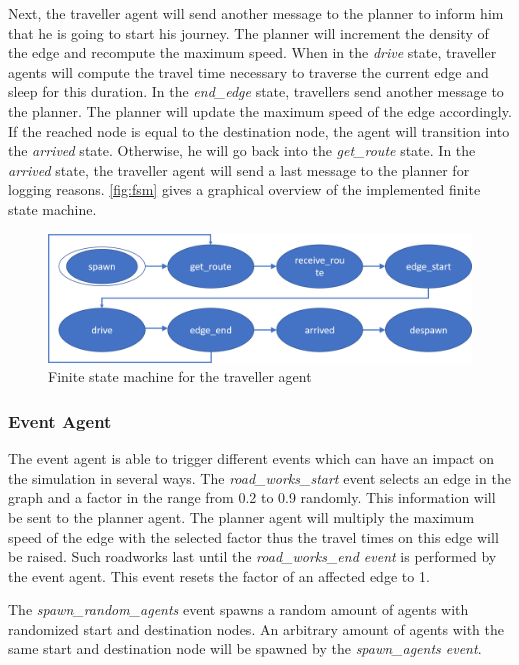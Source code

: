 Next, the traveller agent will send another message to the planner to inform him that he is going to start his journey. The planner will increment the density of the edge and recompute the maximum speed. When in the \textit{drive} state, traveller agents will compute the travel time necessary to traverse the current edge and sleep for this duration.
In the \textit{end\_edge} state, travellers send another message to the planner. The planner will update the maximum speed of the edge accordingly. If the reached node is equal to the destination node, the agent will transition into the \textit{arrived} state. Otherwise, he will go back into the \textit{get\_route} state. In the \textit{arrived} state, the traveller agent will send a last message to the planner for logging reasons. \autoref{fig:fsm} gives a graphical overview of the implemented finite state machine.

\begin{figure}[h]
	\centering
	\includegraphics[width=1\textwidth]{images/FSM.png}
	\caption{Finite state machine for the traveller agent}
	\label{fig:fsm}
\end{figure}

\subsubsection{Event Agent}\label{subsubsec:event}
The event agent is able to trigger different events which can have an impact on the simulation in several ways. The \textit{road\_works\_start} event selects an edge in the graph and a factor in the range from 0.2 to 0.9 randomly. This information will be sent to the planner agent. The planner agent will multiply the maximum speed of the edge with the selected factor thus the travel times on this edge will be raised. Such roadworks last until the\textit{ road\_works\_end event} is performed by the event agent. This event resets the factor of an affected edge to 1.

The \textit{spawn\_random\_agents} event spawns a random amount of agents with randomized start and destination nodes. An arbitrary amount of agents with the same start and destination node will be spawned by the \textit{spawn\_agents event}.

